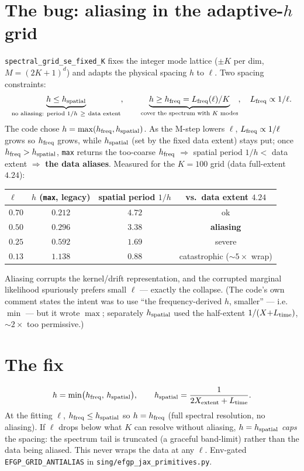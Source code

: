 \documentclass[11pt]{article}
\newcommand{\code}[1]{\texttt{#1}}
\begin{document}
\section{The bug: aliasing in the adaptive-$h$ grid}
\code{spectral\_grid\_se\_fixed\_K} fixes the integer mode lattice
($\pm K$ per dim, $M{=}(2K{+}1)^d$) and adapts the physical spacing $h$ to
$\ell$. Two spacing constraints:
\[
\underbrace{h \le h_{\rm spatial}}_{\text{no aliasing: period }1/h\ \ge\ \text{data extent}},
\qquad
\underbrace{h \ge h_{\rm freq}=L_{\rm freq}(\ell)/K}_{\text{cover the spectrum with }K\text{ modes}},
\quad L_{\rm freq}\propto 1/\ell .
\]
The code chose $h=\max(h_{\rm freq},h_{\rm spatial})$. As the M-step lowers
$\ell$, $L_{\rm freq}\propto1/\ell$ grows so $h_{\rm freq}$ grows, while
$h_{\rm spatial}$ (set by the fixed data extent) stays put; once
$h_{\rm freq}>h_{\rm spatial}$, \code{max} returns the too-coarse $h_{\rm freq}$
$\Rightarrow$ spatial period $1/h<$ data extent $\Rightarrow$ \textbf{the data
aliases}. Measured for the $K{=}100$ grid (data full-extent $4.24$):
\begin{center}\small
\begin{tabular}{@{}lccc@{}}
\toprule
$\ell$ & $h$ (\code{max}, legacy) & spatial period $1/h$ & vs.\ data extent $4.24$ \\
\midrule
$0.70$ & $0.212$ & $4.72$ & ok \\
$0.50$ & $0.296$ & $3.38$ & \textbf{aliasing} \\
$0.25$ & $0.592$ & $1.69$ & severe \\
$0.13$ & $1.138$ & $0.88$ & catastrophic ($\sim5\times$ wrap) \\
\bottomrule
\end{tabular}
\end{center}
Aliasing corrupts the kernel/drift representation, and the corrupted marginal
likelihood spuriously prefers small $\ell$ --- exactly the collapse. (The code's
own comment states the intent was to use ``the frequency-derived $h$, smaller''
--- i.e.\ $\min$ --- but it wrote $\max$; separately $h_{\rm spatial}$ used the
half-extent $1/(X{+}L_{\rm time})$, $\sim2\times$ too permissive.)

\section{The fix}
\begin{equation}
h=\min\!\big(h_{\rm freq},\,h_{\rm spatial}\big),
\qquad
h_{\rm spatial}=\frac{1}{2X_{\rm extent}+L_{\rm time}} .
\end{equation}
At the fitting $\ell$, $h_{\rm freq}\le h_{\rm spatial}$ so $h=h_{\rm freq}$
(full spectral resolution, no aliasing). If $\ell$ drops below what $K$ can
resolve without aliasing, $h=h_{\rm spatial}$ \emph{caps} the spacing: the
spectrum tail is truncated (a graceful band-limit) rather than the data being
aliased. This never wraps the data at any $\ell$. Env-gated
\code{EFGP\_GRID\_ANTIALIAS} in \code{sing/efgp\_jax\_primitives.py}.
\end{document}
